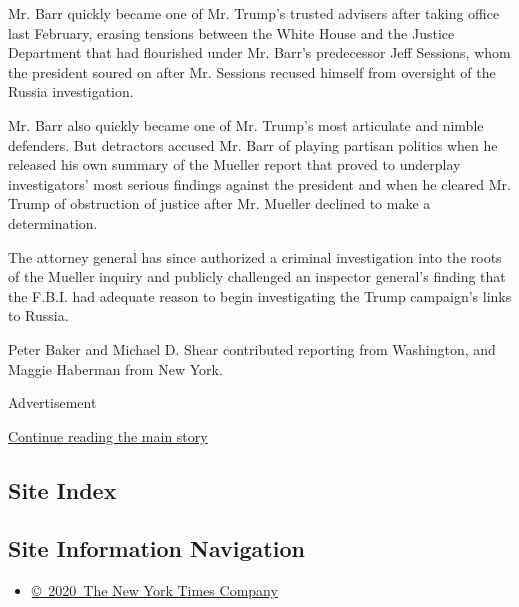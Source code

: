 Mr. Barr quickly became one of Mr. Trump's trusted advisers after taking
office last February, erasing tensions between the White House and the
Justice Department that had flourished under Mr. Barr's predecessor Jeff
Sessions, whom the president soured on after Mr. Sessions recused
himself from oversight of the Russia investigation.

Mr. Barr also quickly became one of Mr. Trump's most articulate and
nimble defenders. But detractors accused Mr. Barr of playing partisan
politics when he released his own summary of the Mueller report that
proved to underplay investigators' most serious findings against the
president and when he cleared Mr. Trump of obstruction of justice after
Mr. Mueller declined to make a determination.

The attorney general has since authorized a criminal investigation into
the roots of the Mueller inquiry and publicly challenged an inspector
general's finding that the F.B.I. had adequate reason to begin
investigating the Trump campaign's links to Russia.

Peter Baker and Michael D. Shear contributed reporting from Washington,
and Maggie Haberman from New York.

Advertisement

\protect\hyperlink{after-bottom}{Continue reading the main story}

\hypertarget{site-index}{%
\subsection{Site Index}\label{site-index}}

\hypertarget{site-information-navigation}{%
\subsection{Site Information
Navigation}\label{site-information-navigation}}

\begin{itemize}
\tightlist
\item
  \href{https://help.nytimes3xbfgragh.onion/hc/en-us/articles/115014792127-Copyright-notice}{©~2020~The
  New York Times Company}
\end{itemize}

